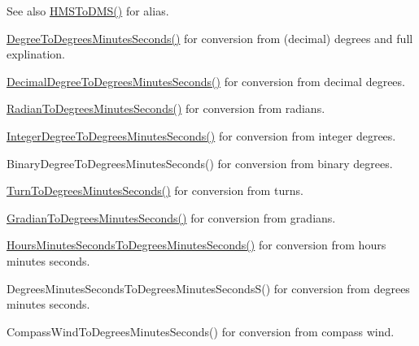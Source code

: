 \begin{DoxySeeAlso}{See also}
\mbox{\hyperlink{group___e_g_x_math-_angle_conversions-_h_m_s_ga7a875e85b32c4d7a8c6fa9a833f2bf7a}{H\+M\+S\+To\+D\+M\+S()}} for alias. 

\mbox{\hyperlink{group___e_g_x_math-_angle_conversions-_degree_ga859585939255d52d010c780c68eb6e23}{Degree\+To\+Degrees\+Minutes\+Seconds()}} for conversion from (decimal) degrees and full explination. 

\mbox{\hyperlink{group___e_g_x_math-_angle_conversions-_decimal_degree_gac5a5255c8d120f71b60d8f60de1a1b6e}{Decimal\+Degree\+To\+Degrees\+Minutes\+Seconds()}} for conversion from decimal degrees. 

\mbox{\hyperlink{group___e_g_x_math-_angle_conversions-_radian_gadae98c255924fdc8b232b6539eae81a9}{Radian\+To\+Degrees\+Minutes\+Seconds()}} for conversion from radians. 

\mbox{\hyperlink{group___e_g_x_math-_angle_conversions-_integer_degree_ga204317877546ea6bbafe5ff558f55a16}{Integer\+Degree\+To\+Degrees\+Minutes\+Seconds()}} for conversion from integer degrees. 

Binary\+Degree\+To\+Degrees\+Minutes\+Seconds() for conversion from binary degrees. 

\mbox{\hyperlink{group___e_g_x_math-_angle_conversions-_turn_gaefdee18d878c2e66e7bd737c8900ab30}{Turn\+To\+Degrees\+Minutes\+Seconds()}} for conversion from turns. 

\mbox{\hyperlink{group___e_g_x_math-_angle_conversions-_gradian_ga5c81967ddb8f677634d161713174e419}{Gradian\+To\+Degrees\+Minutes\+Seconds()}} for conversion from gradians. 

\mbox{\hyperlink{group___e_g_x_math-_angle_conversions-_hours_minutes_seconds_gae9eb0acc65dfe6119936f29ac292afaa}{Hours\+Minutes\+Seconds\+To\+Degrees\+Minutes\+Seconds()}} for conversion from hours minutes seconds. 

Degrees\+Minutes\+Seconds\+To\+Degrees\+Minutes\+Seconds\+S() for conversion from degrees minutes seconds. 

Compass\+Wind\+To\+Degrees\+Minutes\+Seconds() for conversion from compass wind. 
\end{DoxySeeAlso}
\mbox{\label{group___e_g_x_math-_angle_conversions-_h_m_s_ga7a875e85b32c4d7a8c6fa9a833f2bf7a}} 
